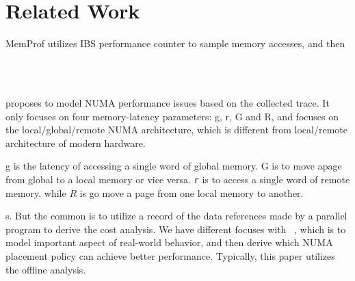 \section{Related Work}
\label{sec:related}

MemProf utilizes IBS performance counter to sample memory accesses, and then ~\cite{Lachaize:2012:MMP:2342821.2342826}

~\cite{Bolosky:1991:NPR:106972.106994} 

proposes to model NUMA performance issues based on the collected trace. It only focuses on four memory-latency parameters: g, r, G and R, and focuses on the local/global/remote NUMA architecture, which is different from local/remote architecture of modern hardware. 

g is the latency of accessing a single word of  global memory. G is to move apage from global to a local memory or vice versa. \texttt{r} is to access a single word of remote memory, while  $R$ is go move a page from one local memory to another. 

s. 
But the common is to utilize a record of the data references made by a parallel program to derive the cost analysis. 
We have different focuses with ~\cite{Bolosky:1991:NPR:106972.106994}, which is to model important aspect of real-world behavior, and then derive which NUMA placement policy can achieve better performance. Typically, this paper utilizes the offline analysis.  